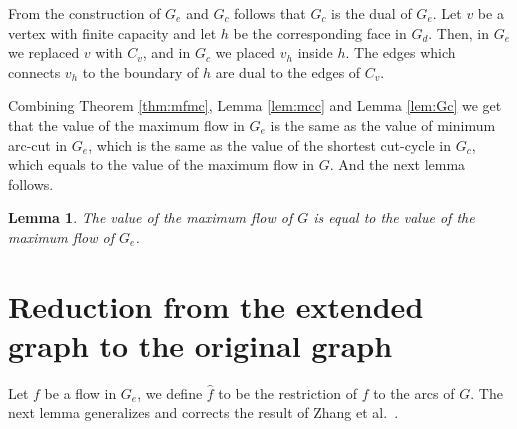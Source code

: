 \documentclass[a4paper,11pt]{article}
\newtheorem{lemma}[theorem]{Lemma}
\begin{document}
From the construction of $G_e$ and $G_c$ follows that $G_c$ is the
dual of $G_e$. Let $v$ be a vertex with finite capacity and let $h$
be the corresponding face in $G_d$. Then, in $G_e$ we replaced $v$
with $C_v$, and in $G_c$ we placed $v_h$ inside $h$. The edges which
connects $v_h$ to the boundary of $h$ are dual to the edges of $C_v$.

Combining Theorem \ref{thm:mfmc}, Lemma \ref{lem:mcc}
and Lemma \ref{lem:Gc} we get that the value of the maximum flow in
$G_e$ is the same as the value of minimum arc-cut in $G_e$, which is
the same as the value of the shortest cut-cycle in $G_c$, which equals
to the value of the maximum flow in $G$. And the next lemma follows.
\begin{lemma} \label{lem:Ge}
    The value of the maximum flow of $G$ is equal to the value of the maximum flow of $G_e$.
\end{lemma}

\section{Reduction from the extended graph to the original graph}
\label{sec:acy}
Let $f$ be a flow in $G_e$,
we define $\hat{f}$
to be the restriction of $f$ to the arcs of $G$.
 The next
lemma generalizes and corrects the result of Zhang et
al.~\cite[Theorem 3]{ZLC08}.
\end{document}
